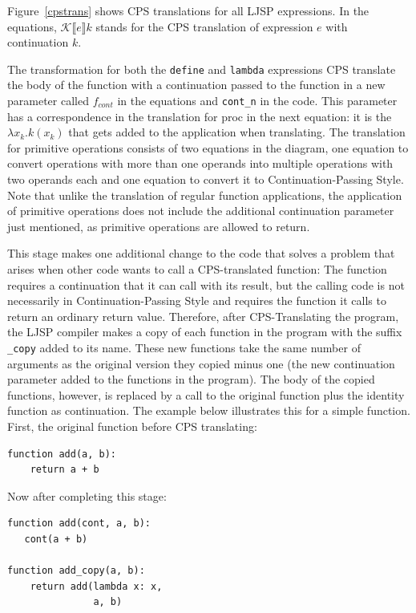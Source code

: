 \documentclass[11pt]{report}
\newcommand{\cpstrans}[1]{\ensuremath{\mathcal{K}\llbracket #1 \rrbracket}}
\begin{document}
Figure~\ref{cpstrans} shows CPS translations for all LJSP expressions. In the equations, $\cpstrans{e} k$ stands for the CPS translation of expression $e$ with continuation $k$.

The transformation for both the \texttt{define} and \texttt{lambda} expressions CPS translate the body of the function with a continuation passed to the function in a new parameter called $f_{cont}$ in the equations and \texttt{cont_n} in the code. This parameter has a correspondence in the translation for proc in the next equation: it is the $\lambda x_k.k(x_k)$ that gets added to the application when translating. The translation for primitive operations consists of two equations in the diagram, one equation to convert operations with more than one operands into multiple operations with two operands each and one equation to convert it to Continuation-Passing Style. Note that unlike the translation of regular function applications, the application of primitive operations does not include the additional continuation parameter just mentioned, as primitive operations are allowed to return.

This stage makes one additional change to the code that solves a problem that arises when other code wants to call a CPS-translated function: The function requires a continuation that it can call with its result, but the calling code is not necessarily in Continuation-Passing Style and requires the function it calls to return an ordinary return value. Therefore, after CPS-Translating the program, the LJSP compiler makes a copy of each function in the program with the suffix \texttt{_copy} added to its name. These new functions take the same number of arguments as the original version they copied minus one (the new continuation parameter added to the functions in the program). The body of the copied functions, however, is replaced by a call to the original function plus the identity function as continuation. The example below illustrates this for a simple function. First, the original function before CPS translating:
\begin{lstlisting}
function add(a, b):
    return a + b
\end{lstlisting}

Now after completing this stage:
\begin{lstlisting}
function add(cont, a, b):
   cont(a + b)
   
function add_copy(a, b):
    return add(lambda x: x, 
               a, b)
\end{lstlisting}
\end{document}
